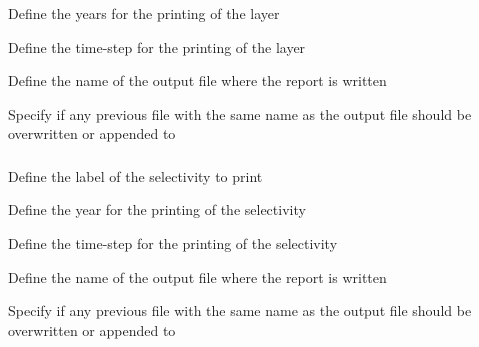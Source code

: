  {Define the years for the printing of the layer}

 {Define the time-step for the printing of the layer}

 {Define the name of the output file where the report is written}

 {Specify if any previous file with the same name as the output file should be overwritten or appended to}

\subsubsection[Print a selectivity]{}

 {Define the label of the selectivity to print}

 {Define the year for the printing of the selectivity}

 {Define the time-step for the printing of the selectivity}

 {Define the name of the output file where the report is written}

 {Specify if any previous file with the same name as the output file should be overwritten or appended to}

\subsubsection[Print the random number seed used]{}

